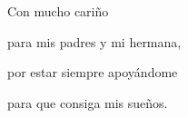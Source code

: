 \clearpage\null\newpage

\begin{dedication}
	Con mucho cariño 
	
	para mis padres y mi hermana,
	
	por estar siempre apoyándome
	
	 para que consiga mis sueños.
\end{dedication}
